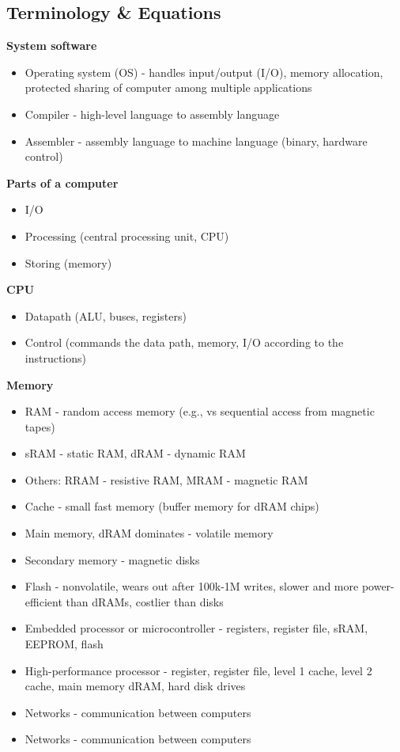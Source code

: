 \subsection*{Terminology & Equations}

\textbf{System software}

\begin{itemize}
\item Operating system (OS) - handles input/output (I/O), memory allocation, protected sharing of computer among multiple applications
\item Compiler - high-level language to assembly language
\item Assembler - assembly language to machine language (binary, hardware control)
\end{itemize}

\textbf{Parts of a computer}

\begin{itemize}
\item I/O
\item Processing (central processing unit, CPU)
\item Storing (memory)
\end{itemize}

\textbf{CPU}

\begin{itemize}
\item Datapath (ALU, buses, registers)
\item Control (commands the data path, memory, I/O according to the instructions)
\end{itemize}

\textbf{Memory}

\begin{itemize}
\item RAM - random access memory (e.g., vs sequential access from magnetic tapes)
\item sRAM - static RAM, dRAM - dynamic RAM
\item Others: RRAM - resistive RAM, MRAM - magnetic RAM
\item Cache - small fast memory (buffer memory for dRAM chips)
\item Main memory, dRAM dominates - volatile memory
\item Secondary memory - magnetic disks
\item Flash - nonvolatile, wears out after 100k-1M writes, slower and more power-efficient than dRAMs, costlier than disks
\item Embedded processor or microcontroller - registers, register file, sRAM, EEPROM, flash
\item High-performance processor - register, register file, level 1 cache, level 2 cache, main memory dRAM, hard disk drives
\item Networks - communication between computers
\item Networks - communication between computers
\end{itemize}